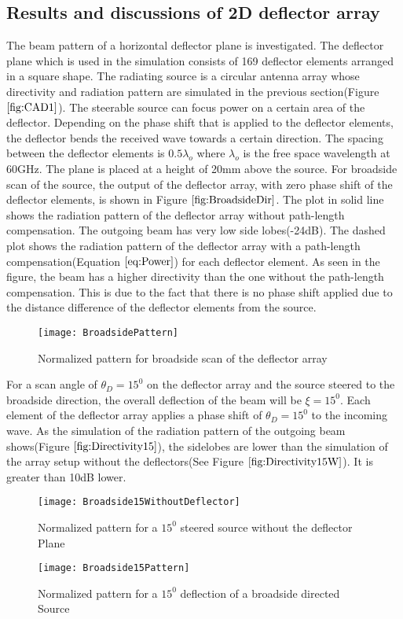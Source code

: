 \documentclass[titlepage]{article}
\begin{document}
\subsection{Results and discussions of 2D deflector array}
The beam pattern of a horizontal deflector plane is investigated. The deflector plane which is used in the simulation consists of 169 deflector elements arranged in a square shape. The radiating source is a circular antenna array whose directivity and radiation pattern are simulated in the previous section(Figure $\ref{fig:CAD1}$). The steerable source can focus power on a certain area of the deflector. Depending on the phase shift that is applied to the deflector elements, the deflector bends the received wave towards a certain direction.
\newline
The spacing between the deflector elements is $0.5\lambda_o$ where $\lambda_o$ is the free space wavelength at 60GHz. The plane is placed at a height of 20mm above the source. For broadside scan of the source, the output of the deflector array, with zero phase shift of the deflector elements, is shown in Figure $\ref{fig:BroadsideDir}$. The plot in solid line shows the radiation pattern of the deflector array without path-length compensation. The outgoing beam has very low side lobes(-24dB). The dashed plot shows the radiation pattern of the deflector array with a path-length compensation(Equation $\ref{eq:Power}$) for each deflector element. As seen in the figure, the beam has a higher directivity than the one without the path-length compensation. This is due to the fact that there is no phase shift applied due to the distance difference of the deflector elements from the source.
\begin{figure}[!hbp]
\centering
\texttt{[image: BroadsidePattern]}
\caption{Normalized pattern for broadside scan of the deflector array}
\label{fig:BroadsideDir}
\end{figure}
\newline
For a scan angle of $\theta_D=15^0$ on the deflector array and the source steered to the broadside direction, the overall deflection of the beam will be $\xi=15^0$. Each element of the deflector array applies a phase shift of $\theta_D=15^0$ to the incoming wave. As the simulation of the radiation pattern of the outgoing beam shows(Figure $\ref{fig:Directivity15}$), the sidelobes are lower than the simulation  of the array setup without the deflectors(See Figure $\ref{fig:Directivity15W}$). It is greater than 10dB lower.
\begin{figure}[!hbp]
\centering
\texttt{[image: Broadside15WithoutDeflector]}
\caption{Normalized pattern for a $15^0$ steered source without the deflector Plane}
\label{fig:Directivity15W}
\end{figure}
\begin{figure}[!hbp]
\centering
\texttt{[image: Broadside15Pattern]}
\caption{Normalized pattern for a $15^0$ deflection of a broadside directed Source}
\label{fig:Directivity15}
\end{figure}
\newline
\end{document}
